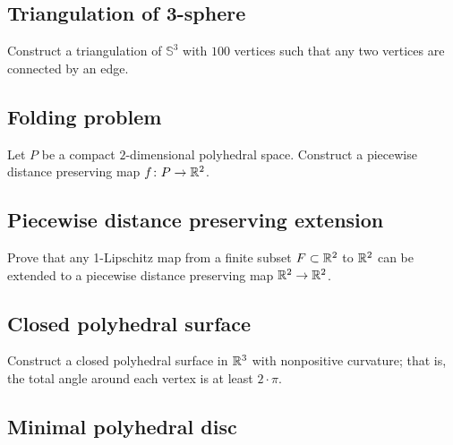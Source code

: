 \subsection*{Triangulation of 3-sphere}\label{4-poly}

\begin{pr}
Construct a triangulation of $\mathbb{S}^3$ 
with $100$ vertices
such that any two vertices are connected by an edge.
\end{pr}

\subsection*{Folding problem}\label{Folding problem}

\begin{pr}
Let $P$ be a compact $2$-dimensional 
polyhedral space. 
Construct a 
piecewise distance preserving map
$f\colon P\to \mathbb{R}^2$.
\end{pr}

\subsection*{Piecewise distance preserving extension}\label{iso-kirzhbraun}

\begin{pr}
Prove that any 1-Lipschitz map from a finite subset $F\subset \mathbb{R}^2$
to 
$\mathbb{R}^2$ can be extended to a 
piecewise distance preserving map
$\mathbb{R}^2\to\mathbb{R}^2$.
\end{pr}

\subsection*{Closed polyhedral surface}\label{Closed polyhedral surface}

\begin{pr}
Construct a closed polyhedral surface in $\mathbb{R}^3$ with nonpositive curvature;
that is, the total angle around each vertex is at least $2\cdot\pi$.
\end{pr}

\subsection*{Minimal polyhedral disc}\label{Minimal polyhedral disc}

